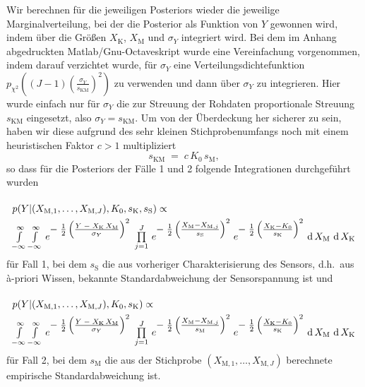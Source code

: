 Wir berechnen für die jeweiligen Posteriors wieder die jeweilige
Marginalverteilung, bei der die Posterior als
Funktion von $Y$ gewonnen wird, indem über die Größen $X_\mathrm{K}$, $X_\mathrm{M}$
und $\sigma_Y$ integriert wird. Bei dem im Anhang abgedruckten Matlab/Gnu-Octaveskript wurde
eine Vereinfachung vorgenommen, indem darauf verzichtet wurde, für $\sigma_Y$ eine
Verteilungsdichtefunktion $p_{\chi^2} ((J-1) \left(\frac{\sigma_Y}{s_\mathrm{KM}}\right)^2)$ zu
verwenden und dann über $\sigma_Y$ zu integrieren. Hier wurde einfach nur für $\sigma_Y$
die zur Streuung der Rohdaten proportionale Streuung $s_\mathrm{KM}$ eingesetzt, also
$\sigma_Y = s_\mathrm{KM}$. Um von der Überdeckung her sicherer zu sein, haben wir diese aufgrund des
sehr kleinen Stichprobenumfangs noch mit einem heuristischen Faktor $c > 1$ multipliziert
$$
s_\mathrm{KM} \; = \; c \, K_0 \, s_\mathrm{M} ,
$$
so dass für die Posteriors der Fälle 1 und 2 folgende Integrationen durchgeführt wurden
\begin{equation}
\arraycolsep=2.0pt\def\arraystretch{2.0}
\begin{array}{l}
p(Y | (X_{\mathrm{M},1}, \dots, X_{\mathrm{M},J}), K_0, s_\mathrm{K}, s_\mathrm{S}) \propto \\
\int\limits_{-\infty}^\infty \int\limits_{-\infty}^\infty \,
e^{\T-\;\frac{1}{2} \left(\frac{ Y \; - \; X_\mathrm{K} \, X_\mathrm{M}}{\sigma_Y} \right)^2}
\; \prod\limits_{j=1}^J  \,
e^{\T-\;\frac{1}{2} \left(\frac{ X_\mathrm{M} - X_{\mathrm{M},j} }{s_\mathrm{S}} \right)^2}
\;  e^{\T-\;\frac{1}{2} \left(\frac{X_\mathrm{K} - K_0}{s_\mathrm{K}} \right)^2}  \,
\operatorname{d}X_\mathrm{M} \, \operatorname{d}X_\mathrm{K}
\end{array}
\label{marginalPosteriorFall1}
\end{equation}
für Fall 1, bei dem $s_\mathrm{S}$ die aus vorheriger Charakterisierung des
Sensors, d.h.\ aus {\`a}-priori Wissen, bekannte Standardabweichung der Sensorspannung ist
und
\begin{equation}
\arraycolsep=2.0pt\def\arraystretch{2.0}
\begin{array}{l}
p(Y | (X_{\mathrm{M},1}, \dots, X_{\mathrm{M},J}), K_0, s_\mathrm{K}) \propto \\
\int\limits_{-\infty}^\infty \int\limits_{-\infty}^\infty \,
e^{\T-\;\frac{1}{2} \left(\frac{ Y \; - \; X_\mathrm{K} \, X_\mathrm{M}}{\sigma_Y} \right)^2}
\;\prod\limits_{j=1}^J \,
 e^{\T-\;\frac{1}{2} \left(\frac{ X_\mathrm{M} - X_{\mathrm{M},j} }{s_\mathrm{M}} \right)^2}
\;  e^{\T-\;\frac{1}{2} \left(\frac{X_\mathrm{K} - K_0}{s_\mathrm{K}} \right)^2} \,
\operatorname{d}X_\mathrm{M} \, \operatorname{d}X_\mathrm{K}
\end{array}
\label{marginalPosteriorFall2}
\end{equation}
für Fall 2, bei dem $s_\mathrm{M}$ die aus der Stichprobe
$(X_{\mathrm{M},1}, \dots, X_{\mathrm{M},J})$ berechnete empirische
Standardabweichung ist.

